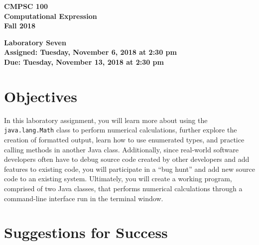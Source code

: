 \documentclass[11pt]{article}
\newcommand{\assignmentduedate}{November 13}
\newcommand{\assignmentassignedate}{November 6}
\newcommand{\assignmentnumber}{Seven}
\newcommand{\labyear}{2018}
\newcommand{\labday}{Tuesday}
\newcommand{\labtime}{2:30 pm}
\newcommand{\assigneddate}{Assigned: \labday, \assignmentassignedate, \labyear{} at \labtime{}}
\newcommand{\duedate}{Due: \labday, \assignmentduedate, \labyear{} at \labtime{}}
\newcommand{\labtitle}[1]
{
  \begin{center}
    \begin{center}
      \bf
      CMPSC 100\\Computational Expression\\
      Fall 2018\\
      \medskip
    \end{center}
    \bf
    #1
  \end{center}
}
\begin{document}
\thispagestyle{empty}

\labtitle{Laboratory \assignmentnumber{} \\ \assigneddate{} \\ \duedate{}}

\section*{Objectives}

In this laboratory assignment, you will learn more about using the {\tt
java.lang.Math} class to perform numerical calculations, further explore the
creation of formatted output, learn how to use enumerated types, and practice
calling methods in another Java class. Additionally, since real-world software
developers often have to debug source code created by other developers and add
features to existing code, you will participate in a ``bug hunt'' and add new
source code to an existing system. Ultimately, you will create a working
program, comprised of two Java classes, that performs numerical calculations
through a command-line interface run in the terminal window.

\section*{Suggestions for Success}
\end{document}
